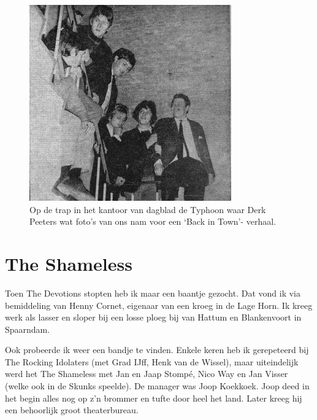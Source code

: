 \documentclass[12pt,twoside, openright]{memoir}
\begin{document}
\begin{figure}
\centering
\includegraphics[width=\textwidth]{img/ch29/rockadzaan8}
\caption*{\footnotesize Op de trap in het kantoor van dagblad de Typhoon waar Derk Peeters wat foto’s van ons nam voor een `Back in Town'- verhaal.}
\end{figure}

\section*{The Shameless} %
\label{cha:shameless}

Toen The Devotions stopten heb ik maar een baantje gezocht. Dat vond ik via bemiddeling van Henny Cornet, eigenaar van een kroeg in de Lage Horn. Ik kreeg werk als lasser en sloper bij een losse ploeg bij van Hattum en Blankenvoort in Spaarndam.

Ook probeerde ik weer een bandje te vinden. Enkele keren heb ik gerepeteerd bij The Rocking Idolaters (met Grad IJff, Henk van de Wissel), maar uiteindelijk werd het The Shameless met Jan en Jaap Stompé, Nico Way en Jan Visser (welke ook in de Skunks speelde). De manager was Joop Koekkoek. Joop deed in het begin alles nog op z’n brommer en tufte door heel het land. Later kreeg hij een behoorlijk groot theaterbureau. 
\end{document}
